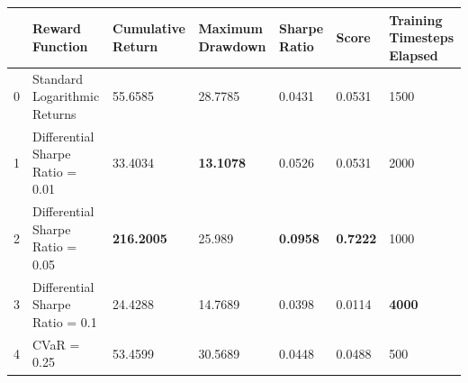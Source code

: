 \begin{tabular}{lllllll}
\toprule
 & Reward Function & Cumulative Return & Maximum Drawdown & Sharpe Ratio & Score & Training Timesteps Elapsed \\
\midrule
0 & Standard Logarithmic Returns & 55.6585 & 28.7785 & 0.0431 & 0.0531 & 1500 \\
1 & Differential Sharpe Ratio = 0.01 & 33.4034 & \textbf{13.1078} & 0.0526 & 0.0531 & 2000 \\
2 & Differential Sharpe Ratio = 0.05 & \textbf{216.2005} & 25.989 & \textbf{0.0958} & \textbf{0.7222} & 1000 \\
3 & Differential Sharpe Ratio = 0.1 & 24.4288 & 14.7689 & 0.0398 & 0.0114 & \textbf{4000} \\
4 & CVaR = 0.25 & 53.4599 & 30.5689 & 0.0448 & 0.0488 & 500 \\
\bottomrule
\end{tabular}
